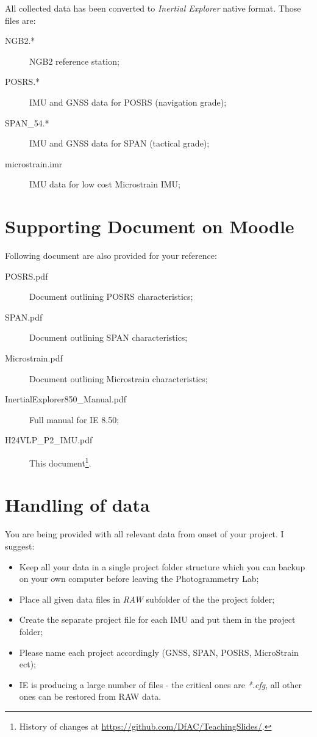 \documentclass[11pt,fleqn]{book} %
\newcommand{\thisDocRef}{\footnote{History of changes at \url{https://github.com/DfAC/TeachingSlides/}.}}
\begin{document}
All collected data has been converted to \emph{Inertial Explorer} native format. Those files are:
	\begin{description}
	\item [{NGB2.{*}}] NGB2 reference station;
	\item [{POSRS.{*}}] IMU and GNSS data for POSRS (navigation grade);
	\item [{SPAN\_54.{*}}] IMU and GNSS data for SPAN (tactical grade);
	\item [{microstrain.imr}] IMU data for low cost Microstrain IMU;
	\end{description}


\section{Supporting Document on Moodle}

Following document are also provided for your reference:

	\begin{description}
	\item [{POSRS.pdf}] Document outlining POSRS characteristics;
	\item [{SPAN.pdf}] Document outlining SPAN characteristics;
	\item [{Microstrain.pdf}] Document outlining Microstrain characteristics;
	\item [{InertialExplorer850\_Manual.pdf}] Full manual for IE 8.50;
	\item [{H24VLP\_P2\_IMU.pdf}] This document\thisDocRef.
	\end{description}

\section{Handling of data}

You are being provided with all relevant data from onset of your project. I suggest:

\begin{itemize}
	\item Keep all your data in a single project folder structure which you can backup on your own computer before leaving the Photogrammetry Lab;
	\item Place all given data files in \textit{RAW} subfolder of the the project folder;
	\item Create the separate project file for each IMU and put them in the project folder;
	\item Please name each project accordingly (GNSS, SPAN, POSRS, MicroStrain ect); 
	\item IE is producing a large number of files - the critical ones are \textit{*.cfg}, all other ones can be restored from RAW data.
\end{itemize}
\end{document}
